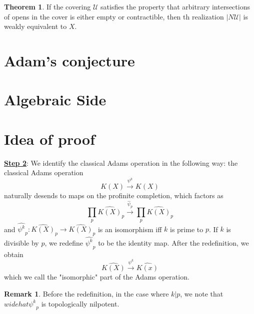 \documentclass{article}
\theoremstyle{definition}
\newtheorem{theorem}{Theorem}[section]
\theoremstyle{definition}
\theoremstyle{definition}
\newtheorem{remark}{Remark}[theorem]
\theoremstyle{definition}
\theoremstyle{definition}
\theoremstyle{definition}
\theoremstyle{definition}
\begin{document}
\begin{tcolorbox}[colback=red!5!white,colframe=red!30!white]
\begin{theorem}
If the covering $\mathcal{U}$ satisfies the property that arbitrary intersections of opens in the cover is either empty or contractible, then th realization $|N \mathcal{U}|$ is weakly equivalent to $X$.
\end{theorem}
\end{tcolorbox}


\section{Adam's conjecture}








\section{Algebraic Side}



\section*{Idea of proof}



\underline{\textbf{Step 2}}: We identify the classical Adams operation in the following way: the classical Adams operation 
\[K(X)\xrightarrow{\psi^k}K(X)\]
naturally desends to maps on the profinite completion, which factors as 
\[\prod_p \widehat{K(X)}_p\xrightarrow{\widehat{\psi}_p} \prod_p \widehat{K(X)}_p\]
and $\widehat{\psi^k}_p: \widehat{K(X)}_p\to \widehat{K(X)}_p$ is an isomorphism iff $k$ is prime to $p$. If $k$ is divisible by $p$, we redefine $\widehat{\psi^k}_p$ to be the identity map. After the redefinition, we obtain 
\[\widehat{K(X)}\xrightarrow{\psi^k}\widehat{K(x)}\]
which we call the "isomorphic" part of the Adams operation. 


\begin{tcolorbox}[colback=green!5!white,colframe=green!30!white]
\begin{remark}
Before the redefinition, in the case where $k|p$, we note that$ widehat{\psi^k}_p$ is topologically nilpotent. 
\end{remark}
\end{tcolorbox}
\end{document}
